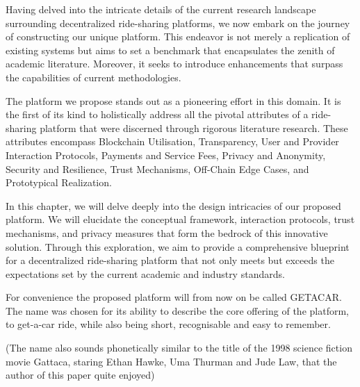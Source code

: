Having delved into the intricate details of the current research landscape surrounding decentralized ride-sharing platforms, we now embark on the journey of constructing our unique platform. This endeavor is not merely a replication of existing systems but aims to set a benchmark that encapsulates the zenith of academic literature. Moreover, it seeks to introduce enhancements that surpass the capabilities of current methodologies.

The platform we propose stands out as a pioneering effort in this domain. It is the first of its kind to holistically address all the pivotal attributes of a ride-sharing platform that were discerned through rigorous literature research. These attributes encompass Blockchain Utilisation, Transparency, User and Provider Interaction Protocols, Payments and Service Fees, Privacy and Anonymity, Security and Resilience, Trust Mechanisms, Off-Chain Edge Cases, and Prototypical Realization.

In this chapter, we will delve deeply into the design intricacies of our proposed platform. We will elucidate the conceptual framework, interaction protocols, trust mechanisms, and privacy measures that form the bedrock of this innovative solution. Through this exploration, we aim to provide a comprehensive blueprint for a decentralized ride-sharing platform that not only meets but exceeds the expectations set by the current academic and industry standards.

For convenience the proposed platform will from now on be called GETACAR. The name was chosen for its ability to describe the core offering of the platform, to get-a-car ride, while also being short, recognisable and easy to remember.

(The name also sounds phonetically similar to the title of the 1998 science fiction movie Gattaca, staring Ethan Hawke, Uma Thurman and Jude Law, that the author of this paper quite enjoyed)